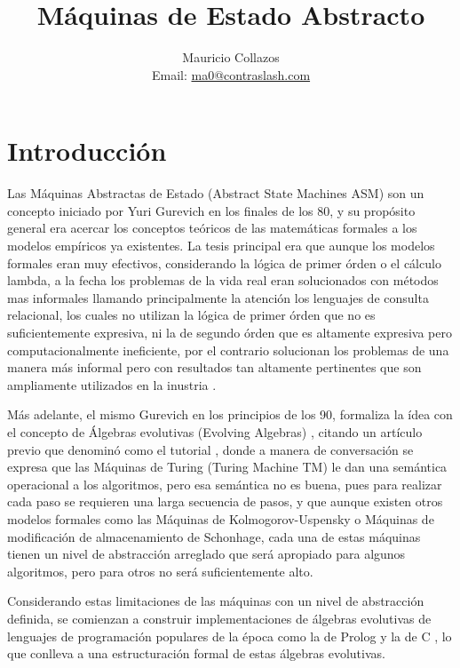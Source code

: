 \documentclass{article}
\title{Máquinas de Estado Abstracto}
\author{Mauricio Collazos \\
Email: \href{mailto:ma0@contraslash.com}{ma0@contraslash.com}}
\begin{document}
\maketitle

\section{Introducción}
Las Máquinas Abstractas de Estado (Abstract State Machines ASM) son un concepto iniciado por Yuri Gurevich en los finales de los 80, y su propósito general era acercar los conceptos teóricos de las matemáticas formales a los modelos empíricos ya existentes. La tesis principal era que aunque los modelos formales eran muy efectivos, considerando la lógica de primer órden o el cálculo lambda, a la fecha los problemas de la vida real eran solucionados con métodos mas informales llamando principalmente la atención los lenguajes de consulta relacional, los cuales no utilizan la lógica de primer órden que no es suficientemente expresiva, ni la de segundo órden que es altamente expresiva pero computacionalmente ineficiente, por el contrario solucionan los problemas de una manera más informal pero con resultados tan altamente pertinentes que son ampliamente utilizados en la inustria \cite{GurevichLogicScience}.

Más adelante, el mismo Gurevich en los principios de los 90, formaliza la ídea con el concepto de Álgebras evolutivas (Evolving Algebras) \cite{GurevichEvolving}, citando un artículo previo que denominó como el tutorial \cite{Gurevich1991EVOLVINGSEMANTICS}, donde a manera de conversación se expresa que las Máquinas de Turing (Turing Machine TM) le dan una semántica operacional a los algoritmos, pero esa semántica no es buena, pues para realizar cada paso se requieren una larga secuencia de pasos, y que aunque existen otros modelos formales como las Máquinas de Kolmogorov-Uspensky o Máquinas de modificación de almacenamiento de Schonhage, cada una de estas máquinas tienen un nivel de abstracción arreglado que será apropiado para algunos algoritmos, pero para otros no será suficientemente alto.

Considerando estas limitaciones de las máquinas con un nivel de abstracción definida, se comienzan a construir implementaciones de álgebras evolutivas de lenguajes de programación populares de la época como la de Prolog \cite{Rosenzweig1995TheCorrectness} y la de C \cite{Gurevich1993TheLanguage}, lo que conlleva a una estructuración formal de estas álgebras evolutivas.
\end{document}
